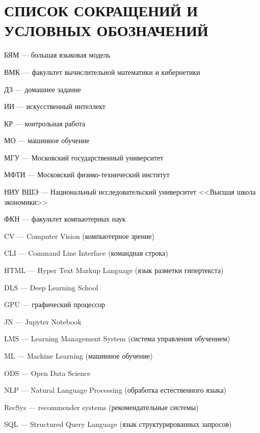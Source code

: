 \chapter*{СПИСОК СОКРАЩЕНИЙ И УСЛОВНЫХ ОБОЗНАЧЕНИЙ}
\setlength{\parindent}{0pt}
\begin{list}{}{%
  \setlength{\leftmargin}{0pt}%
  \setlength{\rightmargin}{1.5cm}%
  \setlength{\labelwidth}{0pt}%
  \setlength{\labelsep}{0pt}%
  \setlength{\itemindent}{0pt}%
  \setlength{\itemsep}{0.5em}%
  \setlength{\parsep}{0pt}%
  \setlength{\topsep}{0pt}%
}
\item[] БЯМ --- большая языковая модель
\item[] ВМК --- факультет вычислительной математики и кибернетики
\item[] ДЗ --- домашнее задание
\item[] ИИ --- искусственный интеллект
\item[] КР --- контрольная работа
\item[] МО --- машинное обучение
\item[] МГУ --- Московский государственный университет
\item[] МФТИ --- Московский физико-технический институт
\item[] НИУ ВШЭ --- Национальный исследовательский университет <<Высшая школа экономики>>
\item[] ФКН --- факультет компьютерных наук
\item[] CV --- Computer Vision (компьютерное зрение)
\item[] CLI --- Command Line Interface (командная строка)
\item[] HTML --- Hyper Text Markup Language (язык разметки гипертекста)
\item[] DLS --- Deep Learning School
\item[] GPU --- графический процессор
\item[] JN --- Jupyter Notebook
\item[] LMS --- Learning Management System (система управления обучением)
\item[] ML --- Machine Learning (машинное обучение)
\item[] ODS --- Open Data Science
\item[] NLP --- Natural Language Processing (обработка естественного языка)
\item[] RecSys --- recommender systems (рекомендательные системы)
\item[] SQL --- Structured Query Language (язык структурированных запросов)
\end{list}